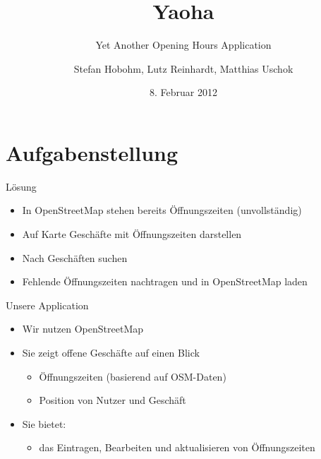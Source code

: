 \documentclass[hyperref]{beamer}
\title{Yaoha}
\subtitle{Yet Another Opening Hours Application}
\author[Hobohm, Reinhardt, Uschok]{Stefan Hobohm, Lutz Reinhardt, Matthias Uschok}
\institute[TU Braunschweig, IBR]{Technische Universität Braunschweig, IBR}
\date{8. Februar 2012}
\begin{document}
\frame[plain]{\titlepage}
\section{Aufgabenstellung}



\begin{frame}{Lösung}
\begin{itemize}
\item In OpenStreetMap stehen bereits Öffnungszeiten (unvollständig)
\item Auf Karte Geschäfte mit Öffnungszeiten darstellen
\item Nach Geschäften suchen
\item Fehlende Öffnungszeiten nachtragen und in OpenStreetMap laden
\end{itemize}
\end{frame}

\begin{frame}{Unsere Application}
	\begin{itemize}
	\item Wir nutzen OpenStreetMap
	\item Sie zeigt offene Geschäfte auf einen Blick
			\begin{itemize}
			\item Öffnungszeiten (basierend auf OSM-Daten)
			\item Position von Nutzer und Geschäft						\end{itemize}
	\item Sie bietet:
	\begin{itemize}
		\item das Eintragen, Bearbeiten und aktualisieren von Öffnungszeiten
	\end{itemize}
\end{itemize}
\end{frame}
\end{document}
